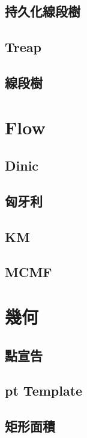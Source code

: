 \documentclass[a4paper,10pt,twocolumn,oneside]{article}
\begin{document}
\subsection{持久化線段樹}

\subsection{Treap}

\subsection{線段樹}

\section{Flow}
\subsection{Dinic}

\subsection{匈牙利}

\subsection{KM}

\subsection{MCMF}

\section{幾何}
\subsection{點宣告}

\subsection{pt Template}

\subsection{矩形面積}

\end{document}
